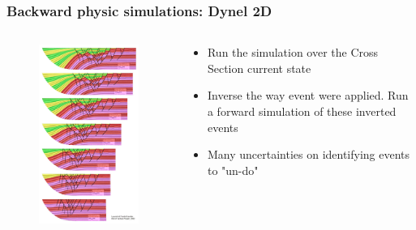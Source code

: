 \documentclass{beamer}
\begin{document}
    
    \begin{frame}
	\frametitle{Backward physic simulations: Dynel 2D }
	\begin{columns}
	\begin{column}{0.55\textwidth}
	\begin{figure}[H]
	\centering
	\vspace*{-0.5cm}
	\includegraphics[scale=0.3]{dynel2D.png}
	\label{dyn2}
	\end{figure}
	\end{column}
	\begin{column}{0.55\textwidth}
	\begin{itemize}
	\item Run the simulation over the Cross Section current state
	\item Inverse the way event were applied. Run a forward simulation of these inverted events
	\item Many uncertainties on identifying events to "un-do"
	\end{itemize} 
	\end{column}
	\end{columns}
    \end{frame}
    	
\end{document}
